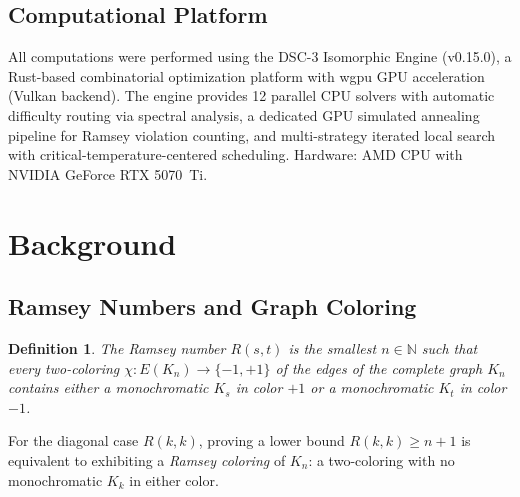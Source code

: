 \documentclass[11pt,a4paper]{article}
\theoremstyle{plain}
\newtheorem{definition}[theorem]{Definition}
\theoremstyle{remark}
\newcommand{\N}{\mathbb{N}}
\begin{document}
\subsection{Computational Platform}

All computations were performed using the DSC-3 Isomorphic Engine
(v0.15.0), a Rust-based combinatorial optimization platform with
wgpu GPU acceleration (Vulkan backend). The engine provides 12
parallel CPU solvers with automatic difficulty routing via spectral
analysis, a dedicated GPU simulated annealing pipeline for Ramsey
violation counting, and multi-strategy iterated local search with
critical-temperature-centered scheduling. Hardware: AMD CPU with
NVIDIA GeForce RTX 5070~Ti.

\section{Background}

\subsection{Ramsey Numbers and Graph Coloring}

\begin{definition}
The \emph{Ramsey number} $R(s,t)$ is the smallest $n \in \N$ such
that every two-coloring $\chi: E(K_n) \to \{-1, +1\}$ of the edges
of the complete graph $K_n$ contains either a monochromatic $K_s$
in color $+1$ or a monochromatic $K_t$ in color $-1$.
\end{definition}

For the diagonal case $R(k,k)$, proving a lower bound
$R(k,k) \geq n+1$ is equivalent to exhibiting a \emph{Ramsey coloring}
of $K_n$: a two-coloring with no monochromatic $K_k$ in either color.
\end{document}
